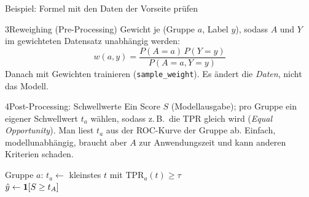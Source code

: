 \begin{hngrid}
\begin{hnex}[raster multicolumn=3]{Beispiel: Formel mit den Daten der Vorseite prüfen}
\end{hnex}
%
\begin{hnp}[raster multicolumn=3,acc=hnnavy]{3}{Reweighing (Pre-Processing)}
Gewicht je (Gruppe $a$, Label $y$), sodass $A$ und $Y$ im gewichteten Datensatz unabhängig werden:
\[ w(a,y)=\frac{P(A{=}a)\,P(Y{=}y)}{P(A{=}a,Y{=}y)} \]
 Danach mit Gewichten trainieren (\texttt{sample\_weight}). Es ändert die \emph{Daten}, nicht das Modell.
\end{hnp}
%
\begin{hnp}[raster multicolumn=6,acc=hngreen]{4}{Post-Processing: Schwellwerte}
Ein Score $S$ (Modellausgabe); pro Gruppe ein eigener Schwellwert $t_a$ wählen, sodass z.\,B.\ die TPR gleich wird (\emph{Equal Opportunity}). Man liest $t_a$ aus der ROC-Kurve der Gruppe ab. Einfach, modellunabhängig, braucht aber $A$ zur Anwendungszeit und kann anderen Kriterien schaden.
\begin{pcode}
 Gruppe $a$: $t_a\leftarrow$ kleinstes $t$ mit $\mathrm{TPR}_a(t)\ge\tau$ \\
$\hat y\leftarrow\mathbf{1}[S\ge t_{A}]$
\end{pcode}
\end{hnp}
%
\end{hngrid}

